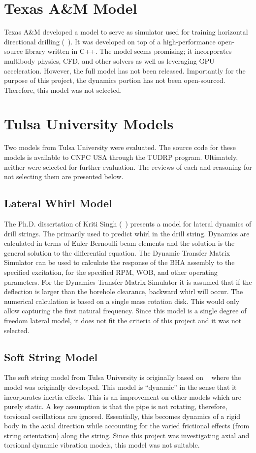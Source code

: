 \section{Texas A\&M Model}
Texas A\&M developed a model to serve as simulator used for training horizontal directional drilling (~\cite{ref:losoya2020a}).  It was developed on top of a high-performance open-source library written in C++.  The model seems promising; it incorporates multibody physics, CFD, and other solvers as well as leveraging GPU acceleration.  However, the full model has not been released.  Importantly for the purpose of this project, the dynamics portion has not been open-sourced.  Therefore, this model was not selected.

\section{Tulsa University Models}
Two models from Tulsa University were evaluated.  The source code for these models is available to CNPC USA through the TUDRP program. Ultimately, neither were selected for further evaluation.  The reviews of each and reasoning for not selecting them are presented below.

\subsection{Lateral Whirl Model}
The Ph.D. dissertation of Kriti Singh (~\cite{ref:singh2019a}) presents a model for lateral dynamics of drill  strings.  The primarily used to predict whirl in the drill string.  Dynamics are calculated in terms of Euler-Bernoulli beam elements and the solution is the general solution to the differential equation.  The Dynamic Transfer Matrix Simulator can be used to calculate the response of the BHA assembly to the specified excitation, for the specified RPM, WOB, and other operating parameters.  For the Dynamics Transfer Matrix Simulator it is assumed that if the deflection is larger than the borehole clearance, backward whirl will occur.  The numerical calculation is based on a single mass rotation disk.  This would only allow capturing the first natural frequency.  Since this model is a single degree of freedom lateral model, it does not fit the criteria of this project and it was not selected.

\subsection{Soft String Model}
The soft string model from Tulsa University is originally based on ~\cite{ref:miska2015a} where the model was originally developed.  This model is ``dynamic'' in the sense that it incorporates inertia effects.  This is an improvement on other models which are purely static.  A key assumption is that the pipe is not rotating, therefore, torsional oscillations are ignored.  Essentially, this becomes dynamics of a rigid body in the axial direction while accounting for the varied frictional effects (from string orientation) along the string.  Since this project was investigating axial and torsional dynamic vibration models, this model was not suitable.

